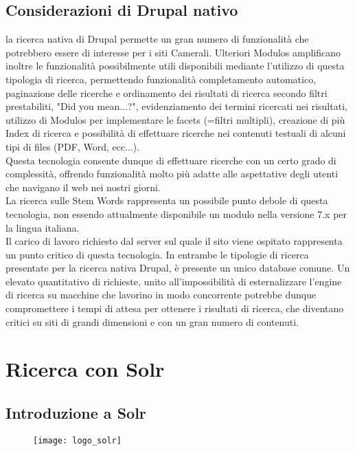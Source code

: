 		\subsection{Considerazioni di Drupal nativo}
		la ricerca nativa di \gls{Drupal} permette un gran numero di funzionalità che potrebbero essere di interesse per i siti Camerali. Ulteriori \glspl{Modulo} amplificano inoltre le funzionalità possibilmente utili disponibili mediante l'utilizzo di questa tipologia di ricerca, permettendo funzionalità completamento automatico, paginazione delle ricerche e ordinamento dei risultati di ricerca secondo filtri prestabiliti, "Did you mean...?", evidenziamento dei termini ricercati nei risultati, utilizzo di \glspl{Modulo} per implementare le facets (=filtri multipli), creazione di più \gls{Index} di ricerca e possibilità di effettuare ricerche nei contenuti testuali di alcuni tipi di files (PDF, Word, ecc...). \\
		Questa tecnologia consente dunque di effettuare ricerche con un certo grado di complessità, offrendo funzionalità molto più adatte alle aspettative degli utenti che navigano il web nei nostri giorni. \\
		La ricerca sulle \gls{Stem Words} rappresenta un possibile punto debole di questa tecnologia, non essendo attualmente disponibile un modulo nella versione 7.x per la lingua italiana.\\
		Il carico di lavoro richiesto dal server sul quale il sito viene ospitato rappresenta un punto critico di questa tecnologia. In entrambe le tipologie di ricerca presentate per la ricerca nativa \gls{Drupal}, è presente un unico database comune. Un elevato quantitativo di richieste, unito all'impossibilità di esternalizzare l'engine di ricerca su macchine che lavorino in modo concorrente potrebbe dunque compromettere i tempi di attesa per ottenere i risultati di ricerca, che diventano critici su siti di grandi dimensioni e con un gran numero di contenuti.

	\section{Ricerca con Solr}

		\subsection{Introduzione a Solr}
		
		\begin{figure}[htbp]
			\begin{center}
				\texttt{[image: logo\_solr]}
			\end{center}
		\end{figure}
	
